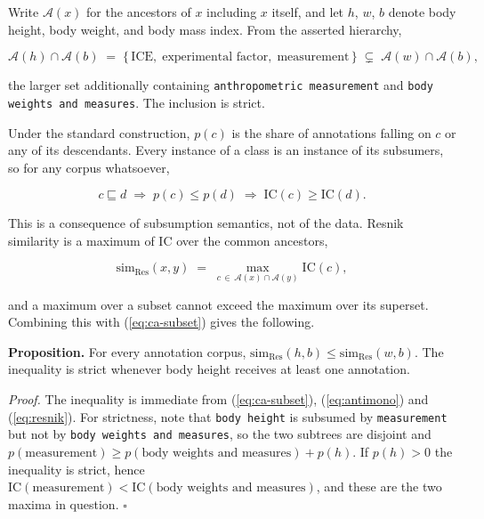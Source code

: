 Write $\mathcal{A}(x)$ for the ancestors of $x$ including $x$ itself, and let $h$, $w$, $b$ denote body height, body weight, and body mass index. From the asserted hierarchy,

\begin{equation}
\label{eq:ca-subset}
\mathcal{A}(h) \cap \mathcal{A}(b)
\;=\; \{\,\textrm{ICE},\; \textrm{experimental factor},\; \textrm{measurement}\,\}
\;\subsetneq\;
\mathcal{A}(w) \cap \mathcal{A}(b),
\end{equation}

the larger set additionally containing \texttt{anthropometric measurement} and \texttt{body weights and measures}. The inclusion is strict.

Under the standard construction, $p(c)$ is the share of annotations falling on $c$ or any of its descendants. Every instance of a class is an instance of its subsumers, so for any corpus whatsoever,

\begin{equation}
\label{eq:antimono}
c \sqsubseteq d \;\Longrightarrow\; p(c) \le p(d) \;\Longrightarrow\; \mathrm{IC}(c) \ge \mathrm{IC}(d).
\end{equation}

This is a consequence of subsumption semantics, not of the data. Resnik similarity is a maximum of IC over the common ancestors,

\begin{equation}
\label{eq:resnik}
\mathrm{sim}_{\mathrm{Res}}(x,y) \;=\; \max_{c \,\in\, \mathcal{A}(x) \cap \mathcal{A}(y)} \mathrm{IC}(c),
\end{equation}

and a maximum over a subset cannot exceed the maximum over its superset. Combining this with (\ref{eq:ca-subset}) gives the following.

\textbf{Proposition.} For every annotation corpus, $\mathrm{sim}_{\mathrm{Res}}(h, b) \le \mathrm{sim}_{\mathrm{Res}}(w, b)$. The inequality is strict whenever body height receives at least one annotation.

\textit{Proof.} The inequality is immediate from (\ref{eq:ca-subset}), (\ref{eq:antimono}) and (\ref{eq:resnik}). For strictness, note that \texttt{body height} is subsumed by \texttt{measurement} but not by \texttt{body weights and measures}, so the two subtrees are disjoint and $p(\textrm{measurement}) \ge p(\textrm{body weights and measures}) + p(h)$. If $p(h) > 0$ the inequality is strict, hence $\mathrm{IC}(\textrm{measurement}) < \mathrm{IC}(\textrm{body weights and measures})$, and these are the two maxima in question. $\square$

